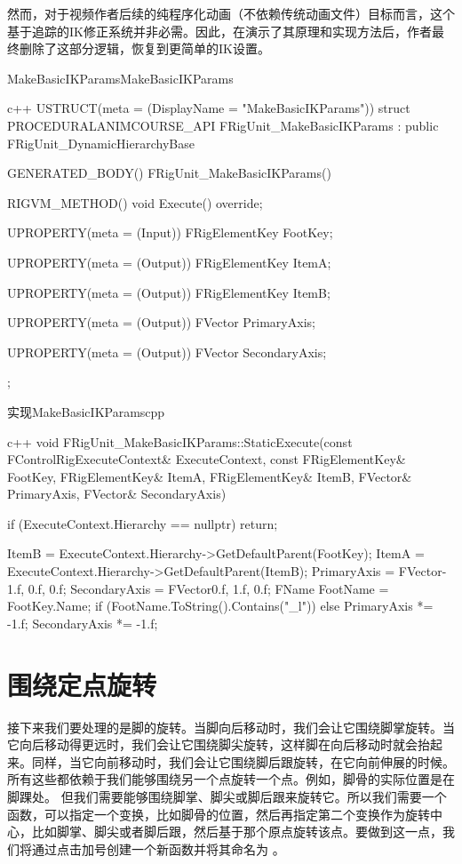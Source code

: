 \documentclass[math,code,12pt]{amznotes}
\begin{document}
    然而，对于视频作者后续的纯程序化动画（不依赖传统动画文件）目标而言，这个基于追踪的IK修正系统并非必需。因此，在演示了其原理和实现方法后，作者最终删除了这部分逻辑，恢复到更简单的IK设置。
\begin{codebox}{MakeBasicIKParams}{MakeBasicIKParams}
	\begin{amzcode}{c++}
USTRUCT(meta = (DisplayName = "MakeBasicIKParams"))
struct PROCEDURALANIMCOURSE_API FRigUnit_MakeBasicIKParams : public FRigUnit_DynamicHierarchyBase
{
	GENERATED_BODY()
	FRigUnit_MakeBasicIKParams(){}
	
	RIGVM_METHOD()
	void Execute() override;

	UPROPERTY(meta = (Input))
	FRigElementKey FootKey;

	UPROPERTY(meta = (Output))
	FRigElementKey ItemA;

	UPROPERTY(meta = (Output))
	FRigElementKey ItemB;

	UPROPERTY(meta = (Output))
	FVector PrimaryAxis;

	UPROPERTY(meta = (Output))
	FVector SecondaryAxis;
};	
  \end{amzcode}
\end{codebox}

\begin{codebox}{实现}{MakeBasicIKParamscpp}
	\begin{amzcode}{c++}
void FRigUnit_MakeBasicIKParams::StaticExecute(const FControlRigExecuteContext& ExecuteContext,
                                               const FRigElementKey& FootKey,
                                               FRigElementKey& ItemA,
                                               FRigElementKey& ItemB,
                                               FVector& PrimaryAxis,
                                               FVector& SecondaryAxis)
{
	if (ExecuteContext.Hierarchy == nullptr) return;

	ItemB = ExecuteContext.Hierarchy->GetDefaultParent(FootKey);
	ItemA = ExecuteContext.Hierarchy->GetDefaultParent(ItemB);
	PrimaryAxis = FVector{-1.f, 0.f, 0.f};
	SecondaryAxis = FVector{0.f, 1.f, 0.f};
	FName FootName = FootKey.Name;
	if (FootName.ToString().Contains("_l")){}
	else
	{
		PrimaryAxis *= -1.f;
		SecondaryAxis *= -1.f;
	}
}	
  \end{amzcode}
\end{codebox}

\section{围绕定点旋转}
接下来我们要处理的是脚的旋转。当脚向后移动时，我们会让它围绕脚掌旋转。当它向后移动得更远时，我们会让它围绕脚尖旋转，这样脚在向后移动时就会抬起来。同样，当它向前移动时，我们会让它围绕脚后跟旋转，在它向前伸展的时候。所有这些都依赖于我们能够围绕另一个点旋转一个点。例如，脚骨的实际位置是在脚踝处。
但我们需要能够围绕脚掌、脚尖或脚后跟来旋转它。所以我们需要一个函数，可以指定一个变换，比如脚骨的位置，然后再指定第二个变换作为旋转中心，比如脚掌、脚尖或者脚后跟，然后基于那个原点旋转该点。要做到这一点，我们将通过点击加号创建一个新函数并将其命名为 。
\end{document}
